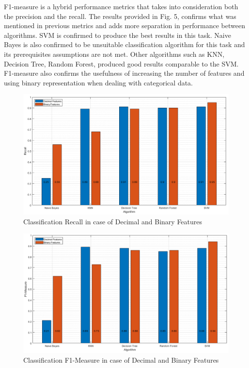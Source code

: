 \documentclass{article}
\begin{document}
F1-measure is a hybrid performance metrics that takes into consideration both the precision and the recall. The results provided in Fig. 5, confirms what was mentioned in previous metrics and adds more separation in performance between algorithms. SVM is confirmed to produce the best results in this task. Naive Bayes is also confirmed to be unsuitable classification algorithm for this task and its prerequisites assumptions are not met. Other algorithms such as KNN, Decision Tree, Random Forest, produced good results comparable to the SVM. F1-measure also confirms the usefulness of increasing the number of features and using binary representation when dealing with categorical data. 


\begin{figure}[H]
\centering
\includegraphics[width=\textwidth]{../Figures/recall.png}
\caption{Classification Recall in case of Decimal and Binary Features}
\end{figure}

\begin{figure}[H]
\centering
\includegraphics[width=\textwidth]{../Figures/f1.png}
\caption{Classification F1-Measure in case of Decimal and Binary Features}
\end{figure}
\end{document}
